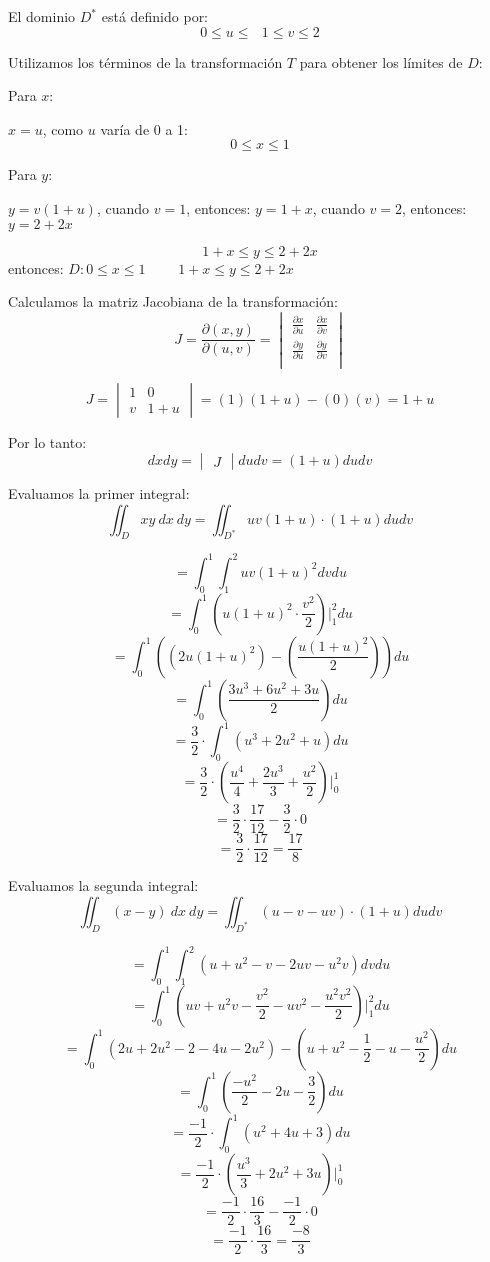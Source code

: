 El dominio $D^*$ está definido por:
$$0 \leq u \leq \ \ \  1 \leq v \leq 2$$

Utilizamos los términos de la transformación $T$ para obtener los límites de $D$:

\vspace{1em}

Para $x$:

$x = u$, como $u$ varía de 0 a 1:
$$0 \leq x \leq 1$$

\vspace{1em}

Para $y$:

$y = v(1+u)$, cuando $v = 1$, entonces: $y = 1 + x$, cuando $v = 2$, entonces: $y= 2 + 2x$

$$1 + x \leq y \leq 2 + 2x$$
entonces: $D: 0 \leq x \leq 1$ \ \ \ \ $1 + x \leq y \leq 2 + 2x$

Calculamos la matriz Jacobiana de la transformación:
$$J = \frac{\partial(x,y)}{\partial(u,v)} = \begin{vmatrix}
    \frac{\partial x}{\partial u} & \frac{\partial x}{\partial v}\\
\frac{\partial y}{\partial u} & \frac{\partial y}{\partial v}\\
\end{vmatrix}$$

$$J = \begin{vmatrix}
1 & 0\\
v & 1 + u
\end{vmatrix} = (1)(1 + u) - (0)(v) = 1 + u$$

Por lo tanto: $$dxdy = \begin{vmatrix}
J
\end{vmatrix} dudv = (1 + u)dudv$$

Evaluamos la primer integral:
$$\iint_D xy \ dx \ dy = \iint_{D^*} uv(1 + u) \cdot (1 + u)dudv$$

$$= \int_{0}^{1}\int_{1}^{2} uv(1 + u)^2dvdu$$
$$= \int_{0}^{1}(u(1 + u)^2 \cdot \frac{v^2}{2}) \Big|_1^2 du$$
$$= \int_{0}^{1}((2u(1 + u)^2) - (\frac{u(1 + u)^2}{2})) du$$
$$= \int_{0}^{1}(\frac{3u^3 + 6u^2 + 3u}{2}) du$$
$$= \frac{3}{2} \cdot \int_{0}^{1}(u^3 + 2u^2 + u) du$$
$$= \frac{3}{2} \cdot (\frac{u^4}{4} + \frac{2u^3}{3} + \frac{u^2}{2}) \Big|_0^1$$
$$= \frac{3}{2} \cdot \frac{17}{12} - \frac{3}{2} \cdot 0$$
$$= \frac{3}{2} \cdot \frac{17}{12} = \frac{17}{8}$$

\vspace{0.3cm}

Evaluamos la segunda integral:
$$\iint_D (x - y) \ dx \ dy = \iint_{D^*} (u - v - uv) \cdot (1 + u)dudv$$

$$= \int_{0}^{1}\int_{1}^{2} (u + u^2 - v -2uv - u^2v)dvdu$$
$$= \int_{0}^{1}(uv + u^2v - \frac{v^2}{2} - uv^2 - \frac{u^2v^2}{2}) \Big|_1^2 du$$
$$= \int_{0}^{1}(2u + 2u^2 - 2 - 4u -2u^2) - (u + u^2 - \frac{1}{2} - u - \frac{u^2}{2}) du$$
$$= \int_{0}^{1}(\frac{-u^2}{2} - 2u - \frac{3}{2}) du$$
$$= \frac{-1}{2} \cdot \int_{0}^{1}(u^2 + 4u + 3) du$$
$$= \frac{-1}{2} \cdot (\frac{u^3}{3} + 2u^2 + 3u) \Big|_0^1$$
$$= \frac{-1}{2} \cdot \frac{16}{3} - \frac{-1}{2} \cdot 0$$
$$= \frac{-1}{2} \cdot \frac{16}{3} = \frac{-8}{3}$$
